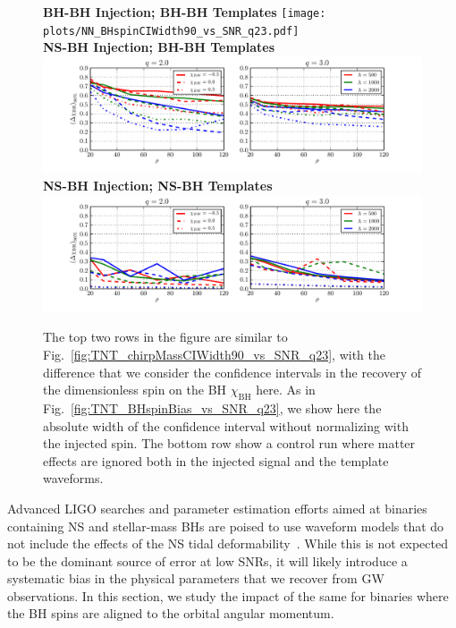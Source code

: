 \documentclass[aps,prd,amsmath,floats,floatfix, twocolumn,
superscriptaddress,nofootinbib,showpacs]{revtex4-1}
\begin{document}
\begin{figure}
\centering    
\textbf{BH-BH Injection; BH-BH Templates}
\texttt{[image: plots/NN\_BHspinCIWidth90\_vs\_SNR\_q23.pdf]}\\ 
\textbf{NS-BH Injection; BH-BH Templates}
\includegraphics[width=1.7\columnwidth]{plots/TN_BHspinCIWidth90_vs_SNR_q23.pdf}\\ 
\textbf{NS-BH Injection; NS-BH Templates}
\includegraphics[width=1.7\columnwidth]{plots/TT_BHspinCIWidth90_vs_SNR_q23.pdf}
\caption{The top two rows in the figure are similar to
Fig.~\ref{fig:TNT_chirpMassCIWidth90_vs_SNR_q23},
with the difference that we consider the confidence intervals in the recovery
of the dimensionless spin on the BH $\chi_\mathrm{BH}$ here.
As in Fig.~\ref{fig:TNT_BHspinBias_vs_SNR_q23}, we show here the absolute 
width of the confidence interval without normalizing with the injected spin.
The bottom row show a control run where matter effects are ignored both 
in the injected signal and the template waveforms.}
\label{fig:TNT_BHspinCIWidth90_vs_SNR_q23}
\end{figure}
% 
% 
Advanced LIGO searches and parameter estimation efforts aimed at binaries 
containing NS and stellar-mass BHs are poised to use waveform models that do not
include the effects of the NS tidal deformability~\cite{Canton:2014ena}.
While this is not expected to
be the dominant source of error at low SNRs, it will likely introduce a
systematic bias in the physical parameters that we recover from GW observations.
In this section, we study the impact of the same for binaries where the BH spins
are aligned to the orbital angular momentum.
\end{document}
